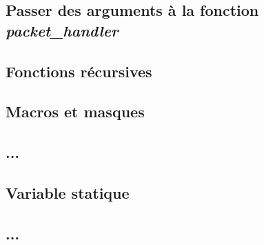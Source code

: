 \documentclass[a4paper]{article}
\begin{document}





\subsection{Passer des arguments à la fonction \textit{packet\_handler}}








\subsection{Fonctions récursives}








\subsection{Macros et masques}








\subsection{...}








\subsection{Variable statique}








\subsection{...}
\end{document}
